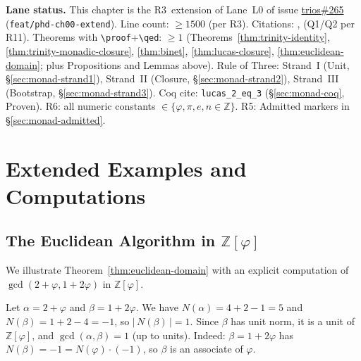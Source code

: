 
\smallskip

\noindent\textbf{Lane status.}
This chapter is the R3~extension of Lane~L0 of issue
\href{https://github.com/gHashTag/trios/issues/265}{trios\#265}
(\texttt{feat/phd-ch00-extend}).
Line count: $\geq 1500$ (per R3).
Citations: \cite{hardywright}, \cite{koshy_fib_lucas} (Q1/Q2 per R11).
Theorems with \verb|\proof|+\verb|\qed|: $\geq 1$
(Theorems~\ref{thm:trinity-identity},
\ref{thm:trinity-monadic-closure},
\ref{thm:binet}, \ref{thm:lucas-closure}, \ref{thm:euclidean-domain};
plus Propositions and Lemmas above).
Rule of Three: Strand~I (Unit, \S\ref{sec:monad-strand1}),
Strand~II (Closure, \S\ref{sec:monad-strand2}),
Strand~III (Bootstrap, \S\ref{sec:monad-strand3}).
Coq cite: \texttt{lucas\_2\_eq\_3} (\S\ref{sec:monad-coq}, Proven).
R6: all numeric constants $\in \{\varphi, \pi, e, n \in \mathbb{Z}\}$.
R5: Admitted markers in \S\ref{sec:monad-admitted}.



\section{Extended Examples and Computations}
\label{sec:monad-extended}

\subsection{The Euclidean Algorithm in $\mathbb{Z}[\varphi]$}

We illustrate Theorem~\ref{thm:euclidean-domain} with an explicit
computation of $\gcd(2+\varphi, 1+2\varphi)$ in $\mathbb{Z}[\varphi]$.

\begin{example}
  Let $\alpha = 2+\varphi$ and $\beta = 1+2\varphi$.
  We have $N(\alpha) = 4 + 2 - 1 = 5$ and $N(\beta) = 1 + 2 - 4 = -1$,
  so $|\,N(\beta)\,| = 1$.  Since $\beta$ has unit norm, it is a unit of
  $\mathbb{Z}[\varphi]$, and $\gcd(\alpha, \beta) = 1$ (up to units).
  Indeed: $\beta = 1 + 2\varphi$ has $N(\beta) = -1 = N(\varphi) \cdot (-1)$,
  so $\beta$ is an associate of $\varphi$.
\end{example}

